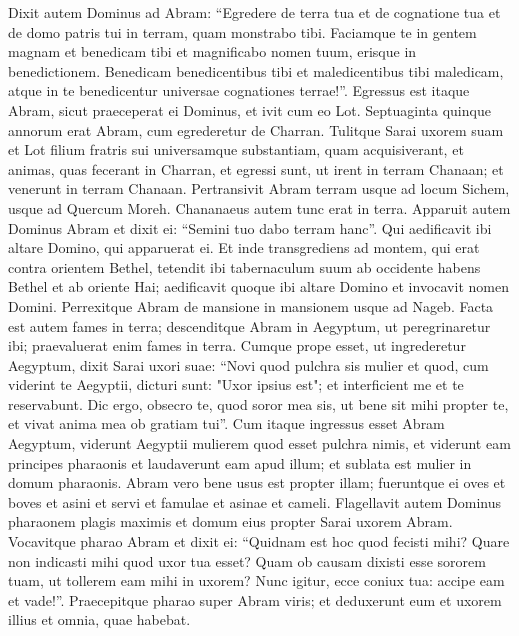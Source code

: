 \begin{biblechapter}
\begin{biblechapter}
\begin{biblechapter}
\begin{biblechapter}
\begin{biblechapter}
\begin{biblechapter}
\begin{biblechapter}
\begin{biblechapter}
\begin{biblechapter}
\begin{biblechapter}
\begin{biblechapter}
\begin{biblechapter}
\verse Dixit autem Dominus ad Abram:
 “Egredere de terra tua et de cognatione tua
 et de domo patris tui
 in terram, quam monstrabo tibi.
 \verse Faciamque te in gentem magnam
 et benedicam tibi
 et magnificabo nomen tuum,
 erisque in benedictionem.
 \verse Benedicam benedicentibus tibi
 et maledicentibus tibi maledicam,
 atque in te benedicentur
 universae cognationes terrae!”.
 \verse Egressus est itaque Abram, sicut praeceperat ei Dominus, et ivit cum eo Lot. Septuaginta quinque annorum erat Abram, cum egrederetur de Charran. 
\verse Tulitque Sarai uxorem suam et Lot filium fratris sui universamque substantiam, quam acquisiverant, et animas, quas fecerant in Charran, et egressi sunt, ut irent in terram Chanaan; et venerunt in terram Chanaan.
 \verse Pertransivit Abram terram usque ad locum Sichem, usque ad Quercum Moreh. Chananaeus autem tunc erat in terra. 
\verse Apparuit autem Dominus Abram et dixit ei: “Semini tuo dabo terram hanc”. Qui aedificavit ibi altare Domino, qui apparuerat ei.
 \verse Et inde transgrediens ad montem, qui erat contra orientem Bethel, tetendit ibi tabernaculum suum ab occidente habens Bethel et ab oriente Hai; aedificavit quoque ibi altare Domino et invocavit nomen Domini. 
\verse Perrexitque Abram de mansione in mansionem usque ad Nageb.
 \verse Facta est autem fames in terra; descenditque Abram in Aegyptum, ut peregrinaretur ibi; praevaluerat enim fames in terra. 
\verse Cumque prope esset, ut ingrederetur Aegyptum, dixit Sarai uxori suae: “Novi quod pulchra sis mulier 
 \verse et quod, cum viderint te Aegyptii, dicturi sunt: "Uxor ipsius est"; et interficient me et te reservabunt. 
\verse Dic ergo, obsecro te, quod soror mea sis, ut bene sit mihi propter te, et vivat anima mea ob gratiam tui”. 
\verse Cum itaque ingressus esset Abram Aegyptum, viderunt Aegyptii mulierem quod esset pulchra nimis, 
\verse et viderunt eam principes pharaonis et laudaverunt eam apud illum; et sublata est mulier in domum pharaonis. 
\verse Abram vero bene usus est propter illam; fueruntque ei oves et boves et asini et servi et famulae et asinae et cameli. 
\verse Flagellavit autem Dominus pharaonem plagis maximis et domum eius propter Sarai uxorem Abram. 
\verse Vocavitque pharao Abram et dixit ei: “Quidnam est hoc quod fecisti mihi? Quare non indicasti mihi quod uxor tua esset? 
\verse Quam ob causam dixisti esse sororem tuam, ut tollerem eam mihi in uxorem? Nunc igitur, ecce coniux tua: accipe eam et vade!”. 
\verse Praecepitque pharao super Abram viris; et deduxerunt eum et uxorem illius et omnia, quae habebat.
 

\end{biblechapter}
\end{biblechapter}
\end{biblechapter}
\end{biblechapter}
\end{biblechapter}
\end{biblechapter}
\end{biblechapter}
\end{biblechapter}
\end{biblechapter}
\end{biblechapter}
\end{biblechapter}
\end{biblechapter}
